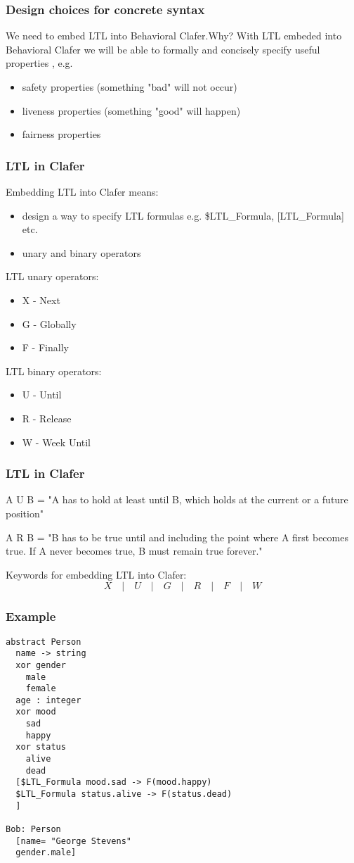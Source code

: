 \documentclass[xcolor=dvipsnames,12pt]{beamer}
\begin{document}
	\begin{frame}
    \frametitle{Design choices for concrete syntax}
    	We need to embed LTL into Behavioral Clafer.Why? With LTL embeded into Behavioral Clafer we will be able to formally and concisely specify useful properties , e.g.
    \begin{itemize}
      \item{safety properties (something "bad" will not occur)}
      \item{liveness properties (something "good" will happen)}
      \item{fairness properties}
    \end{itemize}
	\end{frame}

    \begin{frame}
      \frametitle{LTL in Clafer}
      Embedding LTL into Clafer means:
\begin{itemize}
  \item design a way to specify LTL formulas e.g. \$LTL\_Formula, [LTL\_Formula] etc.
  \item unary and binary operators
\end{itemize}

LTL unary operators:
\begin{itemize}
  \item X - Next 
  \item G - Globally 
  \item F - Finally 
\end{itemize}

LTL binary operators:
\begin{itemize}
  \item U - Until 
  \item R - Release
  \item W - Week Until
\end{itemize}
\end{frame}

    \begin{frame}
      \frametitle{LTL in Clafer}
A U B = "A has to hold at least until B, which holds at the current or a future position"

A R B = "B has to be true until and including the point where A first becomes true. If A never becomes true, B must remain true forever." 

Keywords for embedding LTL into Clafer:
\[X \quad | \quad U  \quad | \quad  G \quad | \quad R \quad  |\quad F \quad | \quad W\]
   \end{frame}

   \begin{frame}[fragile]
     \frametitle{Example}
\begin{verbatim}
abstract Person
  name -> string
  xor gender
    male
    female
  age : integer
  xor mood
    sad
    happy
  xor status
    alive
    dead
  [$LTL_Formula mood.sad -> F(mood.happy)
  $LTL_Formula status.alive -> F(status.dead)
  ]

Bob: Person
  [name= "George Stevens"
  gender.male]
\end{verbatim}
\end{frame}
\end{document}
